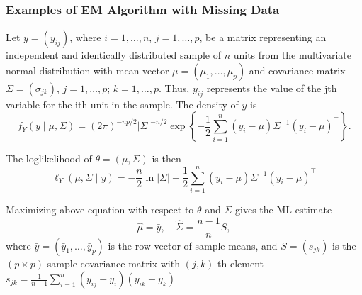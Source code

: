 \subsubsection{Examples of EM Algorithm with Missing Data}

\begin{example}
	Let $y=\left(y_{i j}\right)$, where $i=1, \ldots, n$, $j=1, \ldots, p$, be a matrix representing an independent and identically distributed sample of $n$ units from the multivariate normal distribution with mean vector $\mu=\left(\mu_{1}, \ldots, \mu_{p}\right)$ and covariance matrix $\Sigma=(\sigma_{j k})$, $j=1, \ldots, p$; $k=1,\ldots, p$. Thus, $y_{i j}$ represents the value of the jth variable for the ith unit in the sample. The density of $y$ is
	\begin{equation}
		f_{Y}(y\mid\mu,\Sigma)=(2 \pi)^{-n p / 2}|\Sigma|^{-n / 2} \exp \left\{-\frac{1}{2} \sum_{i=1}^{n}\left(y_{i}-\mu\right) \Sigma^{-1}\left(y_{i}-\mu\right)^{\top}\right\}.
	\end{equation}

	The loglikelihood of $\theta=(\mu, \Sigma)$ is then
	\begin{equation}
		\ell_{Y}(\mu, \Sigma \mid y)=-\frac{n}{2}\ln |\Sigma|-\frac{1}{2} \sum_{i=1}^{n}\left(y_{i}-\mu\right) \Sigma^{-1}\left(y_{i}-\mu\right)^{\top}
	\end{equation}

	Maximizing above equation with respect to $\theta$ and $\Sigma$ gives the ML estimate
	\begin{equation}
		\hat{\mu}=\bar{y},\quad \hat{\Sigma}=\frac{n-1}{n}S,
	\end{equation}
	where $\bar{y}=\left(\bar{y}_{1}, \ldots, \bar{y}_{p}\right)$ is the row vector of sample means, and $S=\left(s_{j k}\right)$ is the $(p\times p)$ sample covariance matrix with $(j, k)$ th element $s_{j k}=\frac{1}{n-1}\sum_{i=1}^{n}\left(y_{i j}-\bar{y}_{i}\right)\left(y_{i k}-\bar{y}_{k}\right)$
\end{example}

